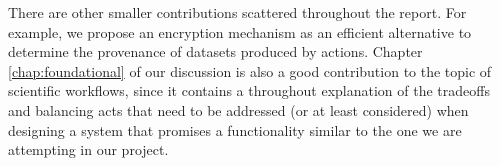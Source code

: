 There are other smaller contributions scattered throughout the report. For example, we propose an encryption mechanism as an efficient alternative to determine the provenance of datasets produced by actions.  Chapter \ref{chap:foundational} of our discussion is also a good contribution to the topic of scientific workflows, since it contains a throughout explanation of the tradeoffs and balancing acts that need to be addressed (or at least considered) when designing a system that promises a functionality similar to the one we are attempting in our project. 


